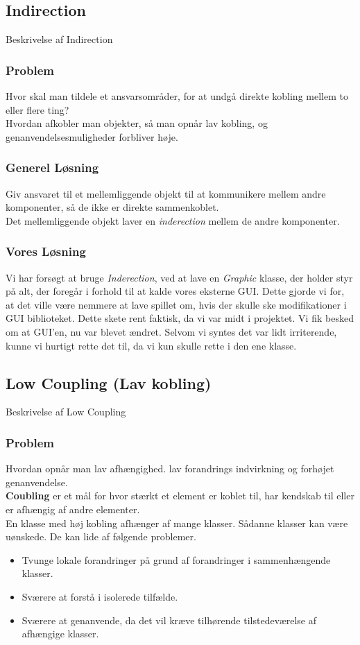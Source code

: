 \subsection{Indirection}
Beskrivelse af Indirection
\subsubsection*{Problem}
Hvor skal man tildele et ansvarsområder, for at undgå direkte kobling mellem to eller flere ting?
\\
Hvordan afkobler man objekter, så man opnår lav kobling, og genanvendelsesmuligheder forbliver høje.
\subsubsection*{Generel Løsning}
Giv ansvaret til et mellemliggende objekt til at kommunikere mellem andre komponenter, så de ikke er direkte sammenkoblet.
\\
Det mellemliggende objekt laver en \textit{inderection} mellem de andre komponenter.
\subsubsection*{Vores Løsning}
Vi har forsøgt at bruge \textit{Inderection}, ved at lave en \textit{Graphic} klasse, der holder styr på alt, der foregår i forhold til at kalde vores eksterne GUI. Dette gjorde vi for, at det ville være nemmere at lave spillet om, hvis der skulle ske modifikationer i GUI biblioteket. Dette skete rent faktisk, da vi var midt i projektet. Vi fik besked om at GUI'en, nu var blevet ændret. Selvom vi syntes det var lidt irriterende, kunne vi hurtigt rette det til, da vi kun skulle rette i den ene klasse.
\subsection{Low Coupling (Lav kobling)}
Beskrivelse af Low Coupling
\subsubsection*{Problem}
Hvordan opnår man lav afhængighed. lav forandrings indvirkning og forhøjet genanvendelse.
\\
\textbf{Coubling} er et mål for hvor stærkt et element er koblet til, har kendskab til eller er afhængig af andre elementer.
\\
En klasse med høj kobling afhænger af mange klasser. Sådanne klasser kan være uønskede. De kan lide af følgende problemer.
\begin{itemize}
\item Tvunge lokale forandringer på grund af forandringer i sammenhængende klasser.
\item Sværere at forstå i isolerede tilfælde.
\item Sværere at genanvende, da det vil kræve tilhørende tilstedeværelse af afhængige klasser.
\end{itemize}
